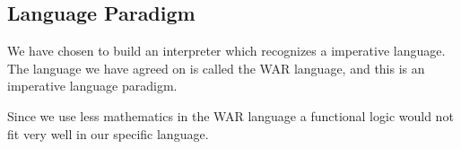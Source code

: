 \subsection{Language Paradigm}

We have chosen to build an interpreter which recognizes a imperative language. The language we have agreed on is called the WAR language, and this is an imperative language paradigm.

Since we use less mathematics in the WAR language a functional logic would not fit very well in our specific language.



